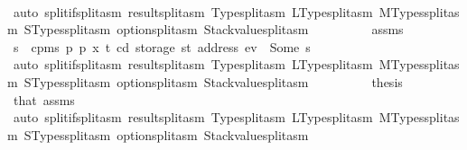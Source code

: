 \begin{isabellebody}
\ \ \ \ \ \ \ \ \isamarkupfalse%
\ {\isacharparenleft}{\kern0pt}auto\ split{\isacharcolon}{\kern0pt}if{\isacharunderscore}{\kern0pt}split{\isacharunderscore}{\kern0pt}asm\ result{\isachardot}{\kern0pt}split{\isacharunderscore}{\kern0pt}asm\ Type{\isachardot}{\kern0pt}split{\isacharunderscore}{\kern0pt}asm\ LType{\isachardot}{\kern0pt}split{\isacharunderscore}{\kern0pt}asm\ MTypes{\isachardot}{\kern0pt}split{\isacharunderscore}{\kern0pt}asm\ STypes{\isachardot}{\kern0pt}split{\isacharunderscore}{\kern0pt}asm\ option{\isachardot}{\kern0pt}split{\isacharunderscore}{\kern0pt}asm\ Stackvalue{\isachardot}{\kern0pt}split{\isacharunderscore}{\kern0pt}asm{\isacharparenright}{\kern0pt}\isanewline
\ \ \ \ \ \ \isamarkupfalse%
\ \isamarkupfalse%
\ assms\ {}\ {}{}\ {}\ {}\ \isamarkupfalse%
\ s\ \ {\isachardoublequoteopen}cpm{}s\ p\ p{\isacharprime}{\kern0pt}\ x\ t\ cd\ {\isacharparenleft}{\kern0pt}storage\ st\ {\isacharparenleft}{\kern0pt}address\ ev{\isacharparenright}{\kern0pt}{\isacharparenright}{\kern0pt}\ {\isacharequal}{\kern0pt}\ Some\ s{\isachardoublequoteclose}\isanewline
\ \ \ \ \ \ \ \ \isamarkupfalse%
\ {\isacharparenleft}{\kern0pt}auto\ split{\isacharcolon}{\kern0pt}if{\isacharunderscore}{\kern0pt}split{\isacharunderscore}{\kern0pt}asm\ result{\isachardot}{\kern0pt}split{\isacharunderscore}{\kern0pt}asm\ Type{\isachardot}{\kern0pt}split{\isacharunderscore}{\kern0pt}asm\ LType{\isachardot}{\kern0pt}split{\isacharunderscore}{\kern0pt}asm\ MTypes{\isachardot}{\kern0pt}split{\isacharunderscore}{\kern0pt}asm\ STypes{\isachardot}{\kern0pt}split{\isacharunderscore}{\kern0pt}asm\ option{\isachardot}{\kern0pt}split{\isacharunderscore}{\kern0pt}asm\ Stackvalue{\isachardot}{\kern0pt}split{\isacharunderscore}{\kern0pt}asm{\isacharparenright}{\kern0pt}\isanewline
\ \ \ \ \ \ \isamarkupfalse%
\ \isamarkupfalse%
\ {\isacharquery}{\kern0pt}thesis\ \isamarkupfalse%
\ that{\isacharparenleft}{\kern0pt}{}{\isacharparenright}{\kern0pt}\ assms\ {}\ {}{}\isanewline
\ \ \ \ \ \ \ \ \isamarkupfalse%
\ {\isacharparenleft}{\kern0pt}auto\ split{\isacharcolon}{\kern0pt}if{\isacharunderscore}{\kern0pt}split{\isacharunderscore}{\kern0pt}asm\ result{\isachardot}{\kern0pt}split{\isacharunderscore}{\kern0pt}asm\ Type{\isachardot}{\kern0pt}split{\isacharunderscore}{\kern0pt}asm\ LType{\isachardot}{\kern0pt}split{\isacharunderscore}{\kern0pt}asm\ MTypes{\isachardot}{\kern0pt}split{\isacharunderscore}{\kern0pt}asm\ STypes{\isachardot}{\kern0pt}split{\isacharunderscore}{\kern0pt}asm\ option{\isachardot}{\kern0pt}split{\isacharunderscore}{\kern0pt}asm\ Stackvalue{\isachardot}{\kern0pt}split{\isacharunderscore}{\kern0pt}asm{\isacharparenright}{\kern0pt}\isanewline

\end{isabellebody}
